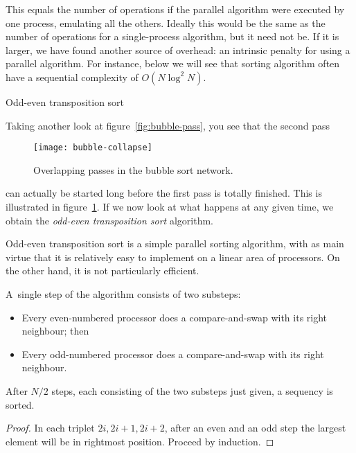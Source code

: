 This equals the number of operations if the parallel algorithm were
executed by one process, emulating all the others. Ideally this would
be the same as the number of operations for a single-process
algorithm, but it need not be. If it is larger, we have found another
source of overhead: an intrinsic penalty for using a parallel
algorithm.
For instance, below we will see that sorting algorithm often have a
sequential complexity of $O(N\log^2N)$.


 {Odd-even transposition sort}

Taking another look at figure~\ref{fig:bubble-pass}, you see that the
second pass
%
\begin{figure}[ht]
  \texttt{[image: bubble-collapse]}
  \caption{Overlapping passes in the bubble sort network.}
  \label{fig:bubble-collapse}
\end{figure}
%
can actually be started long before the first pass is totally
finished. This is illustrated in figure~\ref{fig:bubble-collapse}.
If we now look at what happens at any given time, we obtain the 
\emph{odd-even transposition sort} algorithm.

Odd-even transposition sort is a simple parallel sorting
algorithm, with as main virtue that it is relatively easy to implement
on a linear area of processors. On the other hand, it is not
particularly efficient.

A~single step of the
algorithm consists of two substeps:
\begin{itemize}
\item Every even-numbered processor does a compare-and-swap
  with its right neighbour; then
\item Every odd-numbered processor does a compare-and-swap
  with its right neighbour.
\end{itemize}

\begin{theorem}
  After $N/2$ steps, each consisting of the two substeps just given,
  a sequency is sorted.
\end{theorem}
\begin{proof}
  In each triplet $2i,2i+1,2i+2$, after an even and an odd step the
  largest element will be in rightmost position. Proceed by induction.
\end{proof}


